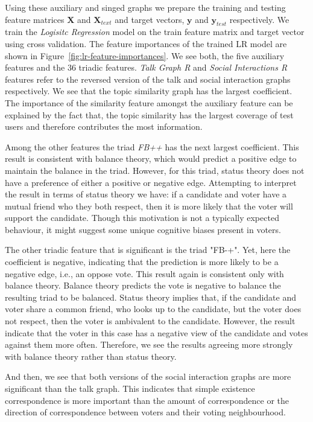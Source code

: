 Using these auxiliary and singed graphs we prepare the training and testing feature matrices $\mathbf{X}$ and $\mathbf{X}_{text}$ and target vectors, $\mathbf{y}$ and $\mathbf{y}_{test}$ respectively.
We train the \textit{Logisitc Regression} model on the train feature matrix and target vector using cross validation.
The feature importances of the trained LR model are shown in Figure~\ref{fig:lr-feature-importances}.
We see both, the five auxiliary features and the 36 triadic features.
\textit{Talk Graph R} and \textit{Social Interactions R} features refer to the reversed version of the talk and social interaction graphs respectively.
We see that the topic similarity graph has the largest coefficient.
The importance of the similarity feature amongst the auxiliary feature can be explained by the fact that, the topic similarity has the largest coverage of test users and therefore contributes the most information.

Among the other features the triad \textit{FB++} has the next largest coefficient.
This result is consistent with balance theory, which would predict a positive edge to maintain the balance in the triad.
However, for this triad, status theory does not have a preference of either a positive or negative edge.
Attempting to interpret the result in terms of status theory we have: if a candidate and voter have a mutual friend who they both respect, then it is more likely that the voter will support the candidate.
Though this motivation is not a typically expected behaviour, it might suggest some unique cognitive biases present in voters. 

The other triadic feature that is significant is the triad "FB-+".
Yet, here the coefficient is negative, indicating that the prediction is more likely to be a negative edge, i.e., an oppose vote.
This result again is consistent only with balance theory.
Balance theory predicts the vote is negative to balance the resulting triad to be balanced.
Status theory implies that, if the candidate and voter share a common friend, who looks up to the candidate, but the voter does not respect, then the voter is ambivalent to the candidate.
However, the result indicate that the voter in this case has a negative view of the candidate and votes against them more often.
Therefore, we see the results agreeing more strongly with balance theory rather than status theory.

And then, we see that both versions of the social interaction graphs are more significant than the talk graph.
This indicates that simple existence correspondence is more important than the amount of correspondence or the direction of correspondence between voters and their voting neighbourhood.

